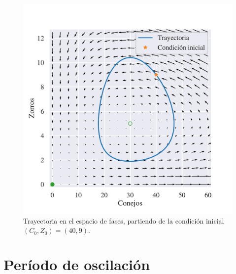 \documentclass[10pt,twocolumn]{article}
\begin{document}
\begin{figure}[t]
\centering
\includegraphics[scale=0.45]{diagrama_de_fases.pdf}
\caption{\label{fig:fases} Trayectoria en el espacio de fases, partiendo de la condición inicial $(C_0, Z_0) = (40, 9)$. }
\end{figure}

\section{Período de oscilación}
\end{document}
